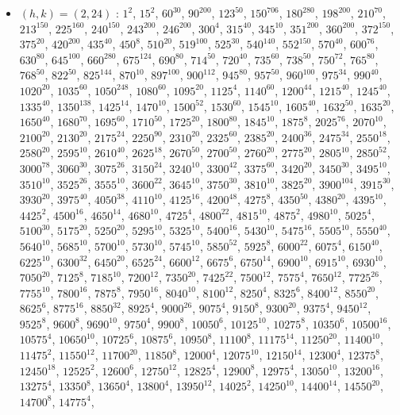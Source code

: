 \begin{itemize}
\item $(h,k)=(2,24)$ : $1^{2}$, $15^{2}$, $60^{30}$, $90^{200}$, $123^{50}$, $150^{706}$, $180^{280}$, $198^{200}$, $210^{70}$, $213^{150}$, $225^{160}$, $240^{150}$, $243^{200}$, $246^{200}$, $300^{4}$, $315^{40}$, $345^{10}$, $351^{200}$, $360^{200}$, $372^{150}$, $375^{20}$, $420^{200}$, $435^{40}$, $450^{8}$, $510^{20}$, $519^{100}$, $525^{30}$, $540^{140}$, $552^{150}$, $570^{40}$, $600^{76}$, $630^{80}$, $645^{100}$, $660^{280}$, $675^{124}$, $690^{80}$, $714^{50}$, $720^{40}$, $735^{60}$, $738^{50}$, $750^{72}$, $765^{80}$, $768^{50}$, $822^{50}$, $825^{144}$, $870^{10}$, $897^{100}$, $900^{112}$, $945^{80}$, $957^{50}$, $960^{100}$, $975^{34}$, $990^{40}$, $1020^{20}$, $1035^{60}$, $1050^{248}$, $1080^{60}$, $1095^{20}$, $1125^{4}$, $1140^{60}$, $1200^{44}$, $1215^{40}$, $1245^{40}$, $1335^{40}$, $1350^{138}$, $1425^{14}$, $1470^{10}$, $1500^{52}$, $1530^{60}$, $1545^{10}$, $1605^{40}$, $1632^{50}$, $1635^{20}$, $1650^{40}$, $1680^{70}$, $1695^{60}$, $1710^{50}$, $1725^{20}$, $1800^{80}$, $1845^{10}$, $1875^{8}$, $2025^{76}$, $2070^{10}$, $2100^{20}$, $2130^{20}$, $2175^{24}$, $2250^{90}$, $2310^{20}$, $2325^{60}$, $2385^{20}$, $2400^{36}$, $2475^{34}$, $2550^{18}$, $2580^{20}$, $2595^{10}$, $2610^{40}$, $2625^{18}$, $2670^{50}$, $2700^{50}$, $2760^{20}$, $2775^{20}$, $2805^{10}$, $2850^{52}$, $3000^{78}$, $3060^{30}$, $3075^{26}$, $3150^{24}$, $3240^{10}$, $3300^{42}$, $3375^{60}$, $3420^{20}$, $3450^{30}$, $3495^{10}$, $3510^{10}$, $3525^{26}$, $3555^{10}$, $3600^{22}$, $3645^{10}$, $3750^{30}$, $3810^{10}$, $3825^{20}$, $3900^{104}$, $3915^{30}$, $3930^{20}$, $3975^{40}$, $4050^{38}$, $4110^{10}$, $4125^{16}$, $4200^{48}$, $4275^{8}$, $4350^{50}$, $4380^{20}$, $4395^{10}$, $4425^{2}$, $4500^{16}$, $4650^{14}$, $4680^{10}$, $4725^{4}$, $4800^{22}$, $4815^{10}$, $4875^{2}$, $4980^{10}$, $5025^{4}$, $5100^{30}$, $5175^{20}$, $5250^{20}$, $5295^{10}$, $5325^{10}$, $5400^{16}$, $5430^{10}$, $5475^{16}$, $5505^{10}$, $5550^{40}$, $5640^{10}$, $5685^{10}$, $5700^{10}$, $5730^{10}$, $5745^{10}$, $5850^{52}$, $5925^{8}$, $6000^{22}$, $6075^{4}$, $6150^{40}$, $6225^{10}$, $6300^{32}$, $6450^{20}$, $6525^{24}$, $6600^{12}$, $6675^{6}$, $6750^{14}$, $6900^{10}$, $6915^{10}$, $6930^{10}$, $7050^{20}$, $7125^{8}$, $7185^{10}$, $7200^{12}$, $7350^{20}$, $7425^{22}$, $7500^{12}$, $7575^{4}$, $7650^{12}$, $7725^{26}$, $7755^{10}$, $7800^{16}$, $7875^{8}$, $7950^{16}$, $8040^{10}$, $8100^{12}$, $8250^{4}$, $8325^{6}$, $8400^{12}$, $8550^{20}$, $8625^{6}$, $8775^{16}$, $8850^{32}$, $8925^{4}$, $9000^{26}$, $9075^{4}$, $9150^{8}$, $9300^{20}$, $9375^{4}$, $9450^{12}$, $9525^{8}$, $9600^{8}$, $9690^{10}$, $9750^{4}$, $9900^{8}$, $10050^{6}$, $10125^{10}$, $10275^{8}$, $10350^{6}$, $10500^{16}$, $10575^{4}$, $10650^{10}$, $10725^{6}$, $10875^{6}$, $10950^{8}$, $11100^{8}$, $11175^{14}$, $11250^{20}$, $11400^{10}$, $11475^{2}$, $11550^{12}$, $11700^{20}$, $11850^{8}$, $12000^{4}$, $12075^{10}$, $12150^{14}$, $12300^{4}$, $12375^{8}$, $12450^{18}$, $12525^{2}$, $12600^{6}$, $12750^{12}$, $12825^{4}$, $12900^{8}$, $12975^{4}$, $13050^{10}$, $13200^{16}$, $13275^{4}$, $13350^{8}$, $13650^{4}$, $13800^{4}$, $13950^{12}$, $14025^{2}$, $14250^{10}$, $14400^{14}$, $14550^{20}$, $14700^{8}$, $14775^{4}$, 
\end{itemize}
